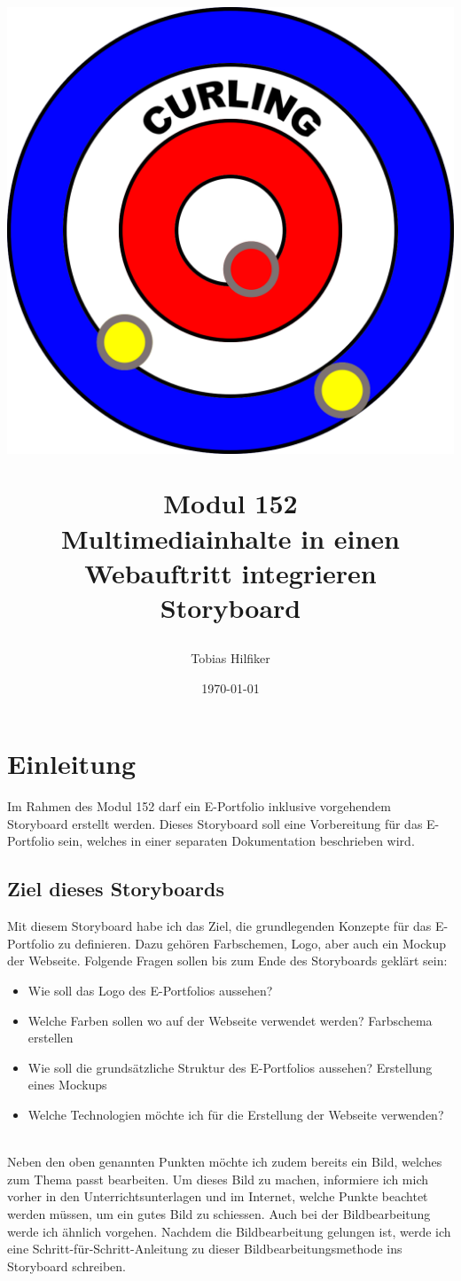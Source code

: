 \documentclass[11pt]{article}
\title{
    \includegraphics[width=\textwidth]{media/curling_logo}
    \begin{center}
        Modul 152 \\
        Multimediainhalte in einen Webauftritt integrieren\\
        Storyboard
    \end{center}}
\author{Tobias Hilfiker}
\date{\today}
\begin{document}
    \begin{titlingpage}
        \maketitle
    \end{titlingpage}
    \pagebreak

    \tableofcontents
    \pagebreak

    \section{Einleitung}
    Im Rahmen des Modul 152 darf ein E-Portfolio inklusive vorgehendem Storyboard erstellt werden.
    Dieses Storyboard soll eine Vorbereitung für das E-Portfolio sein, welches in einer separaten
    Dokumentation beschrieben wird.

    \subsection{Ziel dieses Storyboards}
    Mit diesem Storyboard habe ich das Ziel, die grundlegenden Konzepte für das E-Portfolio zu definieren.
    Dazu gehören Farbschemen, Logo, aber auch ein Mockup der Webseite.
    Folgende Fragen sollen bis zum Ende des Storyboards geklärt sein:
    \begin{itemize}
        \item Wie soll das Logo des E-Portfolios aussehen?
        \item Welche Farben sollen wo auf der Webseite verwendet werden? \textrightarrow Farbschema erstellen
        \item Wie soll die grundsätzliche Struktur des E-Portfolios aussehen?
        \textrightarrow Erstellung eines Mockups
        \item Welche Technologien möchte ich für die Erstellung der Webseite verwenden?
    \end{itemize}
    \\
    Neben den oben genannten Punkten möchte ich zudem bereits ein Bild, welches zum Thema passt bearbeiten.
    Um dieses Bild zu machen, informiere ich mich vorher in den Unterrichtsunterlagen und im Internet, welche
    Punkte beachtet werden müssen, um ein gutes Bild zu schiessen.
    Auch bei der Bildbearbeitung werde ich ähnlich vorgehen. Nachdem die Bildbearbeitung gelungen ist, werde
    ich eine Schritt-für-Schritt-Anleitung zu dieser Bildbearbeitungsmethode ins Storyboard schreiben.
\end{document}
